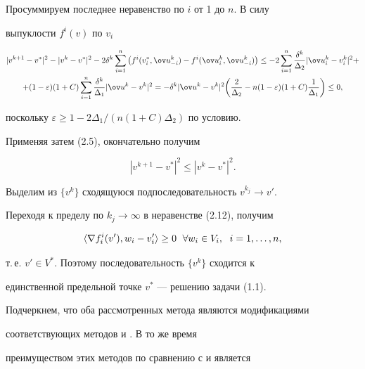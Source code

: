 \begin{pf}
Просуммируем последнее неравенство по $i$ от 1 до $n$. В силу 


выпуклости $f^i(v)$ по $v_i$ 


\begin{multline*} 


|v^{k+1}-v^*|^2-|v^k-v^*|^2-2\delta^k\sum^n_{i=1}\big( 


f^i(v^*_i,\ov u{}^k_{-i})-f^i(\ov u{}^k_i,\ov u{}^k_{-i})\big) 


\le-2\sum^n_{i=1}\frac{\delta^k}{\Delta_2}|\ov u{}^k_i-v^k_i|^2+\\ 


% 


+(1-\varepsilon)(1+C)\sum^n_{i=1}\frac{\delta^k}{\Delta_1} 


|\ov u{}^k-v^k|^2=-\delta^k|\ov u{}^k-v^k|^2\bigg( 


\frac{2}{\Delta_2}-n(1-\varepsilon)(1+C)\frac{1}{\Delta_1} 


\bigg)\le 0, 


\end{multline*} 


поскольку $\varepsilon\ge 1-2\Delta_1/(n(1+C)\Delta_2)$ по условию. 


Применяя затем (2.5), окончательно получим 


$$ 


|v^{k+1}-v^*|^2\le|v^k-v^*|^2. 


$$ 


Выделим из $\{v^k\}$ сходящуюся подпоследовательность $v^{k_j}\to v'$. 


Переходя к пределу по $k_j\to\infty$ в неравенстве (2.12), получим 


$$ 


\la\nabla f^i_i(v'),w_i-v'_i\ra\ge0\ \; \forall w_i\in V_i, 


\ \; i=1,\dotsc,n, 


$$ 


т.\,е. $v'\in V^*$. Поэтому последовательность $\{v^k\}$ сходится к 


единственной предельной точке $v^*$ --- решению задачи (1.1). 


\end{pf} 


 


Подчеркнем, что оба рассмотренных метода являются модификациями 


соответствующих методов \cite{4} и \cite{3}. В то же время 


преимуществом этих методов по сравнению с \cite{4} и \cite{3} является 


